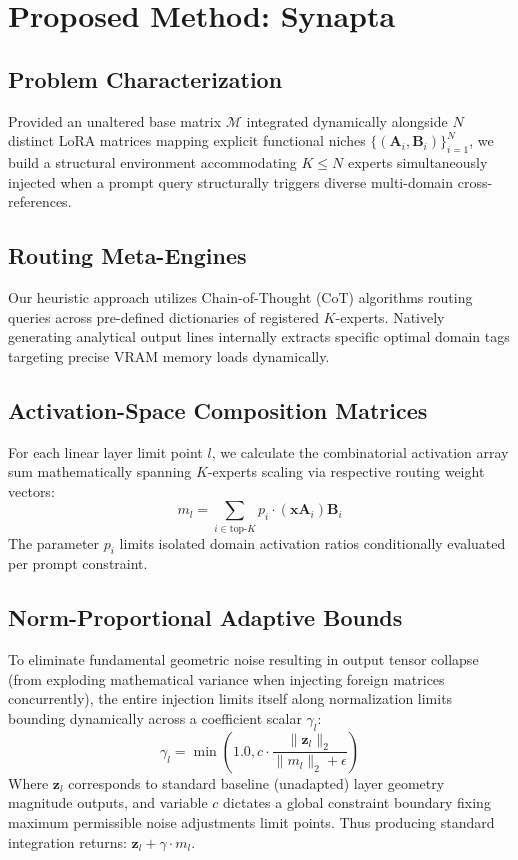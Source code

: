 \documentclass[11pt]{article}
\begin{document}
\section{Proposed Method: Synapta}

\subsection{Problem Characterization}
Provided an unaltered base matrix $\mathcal{M}$ integrated dynamically alongside $N$ distinct LoRA matrices mapping explicit functional niches $\{(\mathbf{A}_i, \mathbf{B}_i)\}_{i=1}^N$, we build a structural environment accommodating $K \leq N$ experts simultaneously injected when a prompt query structurally triggers diverse multi-domain cross-references.

\subsection{Routing Meta-Engines}
Our heuristic approach utilizes Chain-of-Thought (CoT) algorithms routing queries across pre-defined dictionaries of registered $K$-experts. Natively generating analytical output lines internally extracts specific optimal domain tags targeting precise VRAM memory loads dynamically.

\subsection{Activation-Space Composition Matrices}
For each linear layer limit point $l$, we calculate the combinatorial activation array sum mathematically spanning $K$-experts scaling via respective routing weight vectors:
\begin{equation}
m_l = \sum_{i \in \text{top-}K} p_i \cdot (\mathbf{x} \mathbf{A}_i) \mathbf{B}_i
\end{equation}
The parameter $p_i$ limits isolated domain activation ratios conditionally evaluated per prompt constraint.

\subsection{Norm-Proportional Adaptive Bounds}
To eliminate fundamental geometric noise resulting in output tensor collapse (from exploding mathematical variance when injecting foreign matrices concurrently), the entire injection limits itself along normalization limits bounding dynamically across a coefficient scalar $\gamma_l$:
\begin{equation}
\gamma_l = \min\left(1.0, c \cdot \frac{\|\mathbf{z}_l\|_2}{\|m_l\|_2 + \epsilon}\right)
\end{equation}
Where $\mathbf{z}_l$ corresponds to standard baseline (unadapted) layer geometry magnitude outputs, and variable $c$ dictates a global constraint boundary fixing maximum permissible noise adjustments limit points. Thus producing standard integration returns: $\mathbf{z}_l + \gamma \cdot m_l$.
\end{document}

